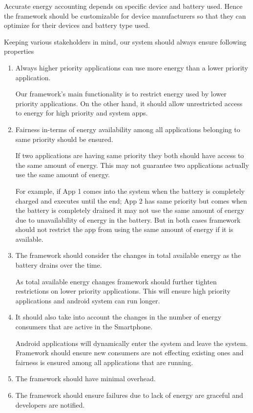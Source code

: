 Accurate energy accounting depends on specific device and battery used. Hence the framework should be customizable for device manufacturers so that they can optimize for their devices and battery type used. 


Keeping various stakeholders in mind, our system should always ensure following properties

\begin{enumerate}
\item Always higher priority applications can use more energy than a lower priority application.

Our framework's main functionality is to restrict energy used by lower priority applications. On the other hand, it should allow unrestricted access to energy for high priority and system apps.

\item Fairness in-terms of energy availability among all applications belonging to same priority should be ensured.

If two applications are having same priority they both should have access to the same amount of energy. This may not guarantee two applications actually use the same amount of energy. 

For example, if App 1 comes into the system when the battery is completely charged and executes until the end;  App 2 has same priority but comes when the battery is completely drained it may not use the same amount of energy due to unavailability of energy in the battery. But in both cases framework should not restrict the app from using the same amount of energy if it is available.

\item The framework should consider the changes in total available energy as the battery drains over the time.

As total available energy changes framework should further tighten restrictions on lower priority applications. This will ensure high priority applications and android system can run longer. 

\item It should also take into account the changes in the number of energy consumers that are active in the Smartphone. 

Android applications will dynamically enter the system and leave the system. Framework should ensure new consumers are not effecting existing ones and fairness is ensured among all applications that are running.

\item The framework should have minimal overhead.
\item The framework should ensure failures due to lack of energy are graceful and developers are notified.


\end{enumerate}
